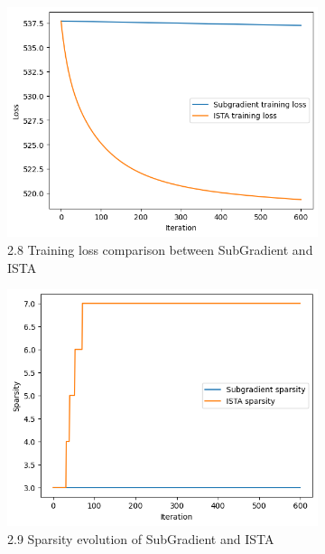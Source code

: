 \documentclass[11pt]{article}
\begin{document}
\begin{figure}[H]
    \centering
    \begin{subfigure}[t]{0.23\textwidth}
        \centering
        \includegraphics[width=\textwidth]{figures/fig8.png}
        \caption{2.8 Training loss comparison between SubGradient and ISTA}
    \end{subfigure}
    \hfill
    \begin{subfigure}[t]{0.23\textwidth}
        \centering
        \includegraphics[width=\textwidth]{figures/fig9.png}
        \caption{2.9 Sparsity evolution of SubGradient and ISTA}
    \end{subfigure}
    \hfill
    \begin{subfigure}[t]{0.23\textwidth}

\end{subfigure}
\end{figure}
\end{document}
